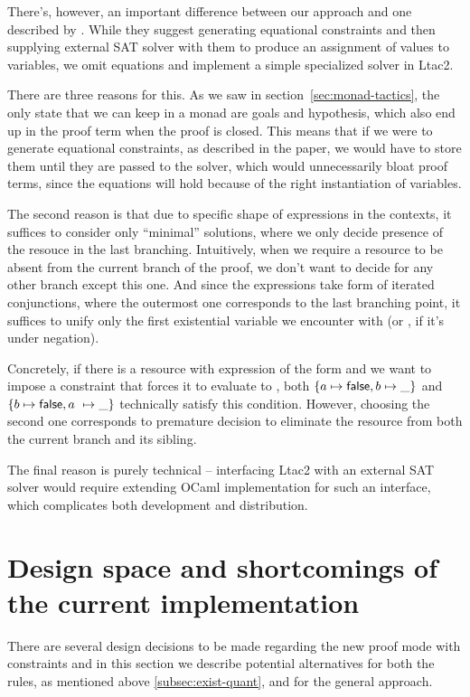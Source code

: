 There's, however, an important difference between our approach and one described by \citet{harlandResourceDistributionBooleanConstraints2003}.
While they suggest generating equational constraints and then supplying external SAT solver with them to produce an assignment of values to variables, we omit equations and implement a simple specialized solver in Ltac2.

There are three reasons for this.
As we saw in section~\ref{sec:monad-tactics}, the only state that we can keep in a monad are goals and hypothesis, which also end up in the proof term when the proof is closed.
This means that if we were to generate equational constraints, as described in the paper, we would have to store them until they are passed to the solver, which would unnecessarily bloat proof terms, since the equations will hold because of the right instantiation of variables.

The second reason is that due to specific shape of expressions in the contexts, it suffices to consider only ``minimal'' solutions, where we only decide presence of the resouce in the last branching.
Intuitively, when we require a resource to be absent from the current branch of the proof, we don't want to decide for any other branch except this one.
And since the expressions take form of iterated conjunctions, where the outermost one corresponds to the last branching point, it suffices to unify only the first existential variable we encounter with \false (or \true, if it's under negation).

Concretely, if there is a resource with expression of the form  and we want to impose a constraint that forces it to evaluate to \false, both \(\left\{a \mapsto \textsf{false}, b \mapsto \_\right\} \) and \(\left\{b \mapsto \textsf{false}, a\ \mapsto \_\right\}\) technically satisfy this condition.
However, choosing the second one corresponds to premature decision to eliminate the resource from both the current branch and its sibling.

The final reason is purely technical -- interfacing Ltac2 with an external SAT solver would require extending OCaml implementation for such an interface, which complicates both development and distribution.

\section{Design space and shortcomings of the current implementation}
\label{sec:poss-designs-comp}

There are several design decisions to be made regarding the new proof mode with constraints and in this section we describe potential alternatives for both the rules, as mentioned above \ref{subsec:exist-quant}, and for the general approach.

